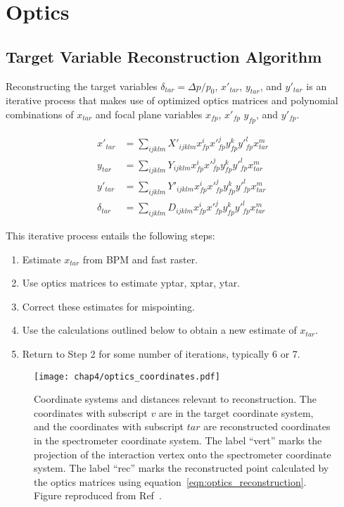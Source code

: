 \section{Optics} \label{sec:optics}

\subsection{Target Variable Reconstruction Algorithm}
Reconstructing the target variables
$\delta_{tar}=\Delta p/p_0$, $x'_{tar}$, $y_{tar}$, and $y'_{tar}$
is an iterative process that makes use of optimized optics matrices
and polynomial combinations of $x_{tar}$ and focal plane variables
$x_{fp}$, $x'_{fp}$ $y_{fp}$, and $y'_{fp}$.

\begin{align} \label{eqn:optics_reconstruction}
    x'_{tar}     &= \sum_{ijklm} X'_{ijklm} x^i_{fp} x'^j_{fp} y^k_{fp} y'^l_{fp} x^m_{tar} \\
    y_{tar}      &= \sum_{ijklm} Y_{ijklm}  x^i_{fp} x'^j_{fp} y^k_{fp} y'^l_{fp} x^m_{tar} \\
    y'_{tar}     &= \sum_{ijklm} Y'_{ijklm} x^i_{fp} x'^j_{fp} y^k_{fp} y'^l_{fp} x^m_{tar} \\
    \delta_{tar} &= \sum_{ijklm} D_{ijklm}  x^i_{fp} x'^j_{fp} y^k_{fp} y'^l_{fp} x^m_{tar}
\end{align}

This iterative process entails the following steps:
\begin{enumerate}
    \item Estimate $x_{tar}$ from BPM and fast raster.
    \item Use optics matrices to estimate yptar, xptar, ytar.
    \item Correct these estimates for mispointing.
    \item Use the calculations outlined below to obtain a new estimate of $x_{tar}$.
    \item Return to Step 2 for some number of iterations, typically 6 or 7.
\end{enumerate}

\begin{figure}[!h]
    \centering
    \texttt{[image: chap4/optics\_coordinates.pdf]}
    \caption[Coordinate systems and distances relevant to reconstruction.]{
            Coordinate systems and distances relevant to reconstruction.
            The coordinates with subscript $v$ are in the target coordinate
            system,
            and the coordinates with subscript $tar$ are reconstructed
            coordinates in the spectrometer coordinate system.
            The label ``vert'' marks the projection of the interaction vertex
            onto the spectrometer coordinate system.
            The label ``rec'' marks the reconstructed point calculated by the
            optics matrices using equation~\ref{eqn:optics_reconstruction}.
            Figure reproduced from Ref~\cite{Bericic_2017}.
            }
    \label{fig:optics_coordinates}
\end{figure}

